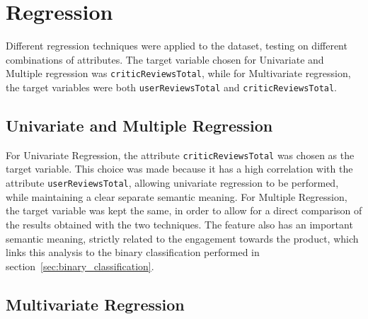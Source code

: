 \chapter{Regression}
\label{ch:capitolo4}
Different regression techniques were applied to the dataset, testing
on different combinations of attributes. The target variable chosen for
Univariate and Multiple regression was \texttt{criticReviewsTotal}, while
for Multivariate regression, the target variables were both
\texttt{userReviewsTotal} and \texttt{criticReviewsTotal}.


\section{Univariate and Multiple Regression}
For Univariate Regression, the attribute
\texttt{criticReviewsTotal} was chosen
as the target variable. This choice was made because it has a high correlation
with the attribute \texttt{userReviewsTotal}, allowing univariate regression
to be performed, while maintaining a clear separate semantic meaning.
For Multiple Regression, the target variable was kept the same, in order to
allow for a direct comparison of the results obtained with the two techniques.
The feature also has an important semantic meaning, strictly related to the
engagement towards the product, which links this analysis to the binary
classification performed in section~\ref{sec:binary_classification}.

\section{Multivariate Regression}
